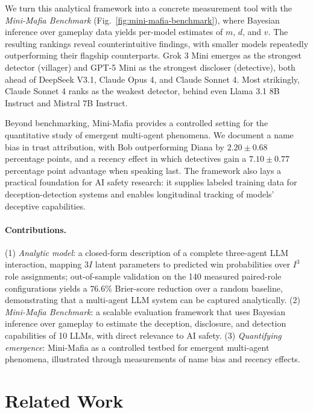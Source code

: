 \documentclass{article}
\begin{document}
We turn this analytical framework into a concrete measurement tool with the \textit{Mini-Mafia Benchmark} (Fig.~\ref{fig:mini-mafia-benchmark}), where Bayesian inference over gameplay data yields per-model estimates of $m$, $d$, and $v$. The resulting rankings reveal counterintuitive findings, with smaller models repeatedly outperforming their flagship counterparts. Grok 3 Mini emerges as the strongest detector (villager) and GPT-5 Mini as the strongest discloser (detective), both ahead of DeepSeek V3.1, Claude Opus 4, and Claude Sonnet 4. Most strikingly, Claude Sonnet 4 ranks as the weakest detector, behind even Llama 3.1 8B Instruct and Mistral 7B Instruct.

Beyond benchmarking, Mini-Mafia provides a controlled setting for the quantitative study of emergent multi-agent phenomena. We document a name bias in trust attribution, with Bob outperforming Diana by $2.20 \pm 0.68$ percentage points, and a recency effect in which detectives gain a $7.10 \pm 0.77$ percentage point advantage when speaking last. The framework also lays a practical foundation for AI safety research: it supplies labeled training data for deception-detection systems and enables longitudinal tracking of models' deceptive capabilities.

\paragraph{Contributions.} (1) \textit{Analytic model}: a closed-form description of a complete three-agent LLM interaction, mapping $3I$ latent parameters to predicted win probabilities over $I^3$ role assignments; out-of-sample validation on the 140 measured paired-role configurations yields a $76.6\%$ Brier-score reduction over a random baseline, demonstrating that a multi-agent LLM system can be captured analytically. (2) \textit{Mini-Mafia Benchmark}: a scalable evaluation framework that uses Bayesian inference over gameplay to estimate the deception, disclosure, and detection capabilities of 10 LLMs, with direct relevance to AI safety. (3) \textit{Quantifying emergence}: Mini-Mafia as a controlled testbed for emergent multi-agent phenomena, illustrated through measurements of name bias and recency effects.



\section{Related Work}
\label{sec:related_work}
\end{document}
